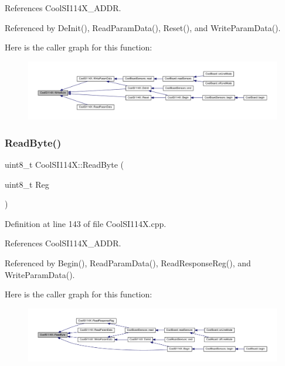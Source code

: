 References Cool\+S\+I114\+X\+\_\+\+A\+D\+DR.



Referenced by De\+Init(), Read\+Param\+Data(), Reset(), and Write\+Param\+Data().

Here is the caller graph for this function\+:
\nopagebreak
\begin{figure}[H]
\begin{center}
\leavevmode
\includegraphics[width=350pt]{dd/d67/class_cool_s_i114_x_ac5c8dc5ade604da7a1c8cd1586feefc2_icgraph}
\end{center}
\end{figure}
\mbox{\label{class_cool_s_i114_x_acc20f8037e156ec4aadcbe90780b1e8b}} 
\subsubsection{\texorpdfstring{Read\+Byte()}{ReadByte()}}
{\footnotesize\ttfamily uint8\+\_\+t Cool\+S\+I114\+X\+::\+Read\+Byte (\begin{DoxyParamCaption}\item[{uint8\+\_\+t}]{Reg }\end{DoxyParamCaption})\hspace{0.3cm}{\ttfamily [private]}}



Definition at line 143 of file Cool\+S\+I114\+X.\+cpp.



References Cool\+S\+I114\+X\+\_\+\+A\+D\+DR.



Referenced by Begin(), Read\+Param\+Data(), Read\+Response\+Reg(), and Write\+Param\+Data().

Here is the caller graph for this function\+:
\nopagebreak
\begin{figure}[H]
\begin{center}
\leavevmode
\includegraphics[width=350pt]{dd/d67/class_cool_s_i114_x_acc20f8037e156ec4aadcbe90780b1e8b_icgraph}
\end{center}
\end{figure}
\mbox{\label{class_cool_s_i114_x_a1d25c9e137874af529804c2ec796a6b9}} 
